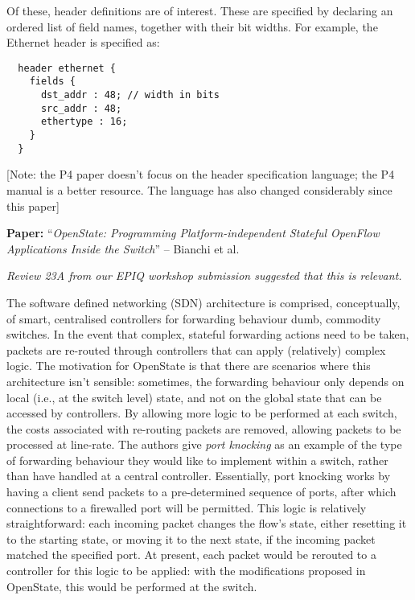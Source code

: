 \documentclass[10pt,a4paper]{article}
\newcommand{\paper}[3]{\vspace{4mm}\noindent\textbf{Paper:} ``\textit{#1}'' -- #2 \cite{#3}\vspace{3mm}}
\begin{document}
Of these, header definitions are of interest. These are specified by declaring an ordered
list of field names, together with their bit widths. For example, the Ethernet header is
specified as:

\begin{verbatim}
  header ethernet {
    fields {
      dst_addr : 48; // width in bits
      src_addr : 48;
      ethertype : 16;
    }
  }
\end{verbatim}

[Note: the P4 paper doesn't focus on the header specification language; the P4 manual is
a better resource. The language has also changed considerably since this paper]

\paper{OpenState: Programming Platform-independent Stateful OpenFlow Applications
       Inside the Switch}{Bianchi et al.}{bianchi:2014:openstate}

\emph{Review 23A from our EPIQ workshop submission suggested that this is relevant.}

The software defined networking (SDN) architecture is comprised, conceptually, of smart,
centralised controllers for forwarding behaviour dumb, commodity switches. In the event
that complex, stateful forwarding actions need to be taken, packets are re-routed through
controllers that can apply (relatively) complex logic. The motivation for OpenState is
that there are scenarios where this architecture isn't sensible: sometimes, the forwarding
behaviour only depends on local (i.e., at the switch level) state, and not on the global
state that can be accessed by controllers. By allowing more logic to be performed at each
switch, the costs associated with re-routing packets are removed, allowing packets to be
processed at line-rate. The authors give \emph{port knocking} as an example of the type
of forwarding behaviour they would like to implement within a switch, rather than have
handled at a central controller. Essentially, port knocking works by having a client send
packets to a pre-determined sequence of ports, after which connections to a firewalled
port will be permitted. This logic is relatively straightforward: each incoming packet
changes the flow's state, either resetting it to the starting state, or moving it to the
next state, if the incoming packet matched the specified port. At present, each packet
would be rerouted to a controller for this logic to be applied: with the modifications
proposed in OpenState, this would be performed at the switch.
\end{document}
